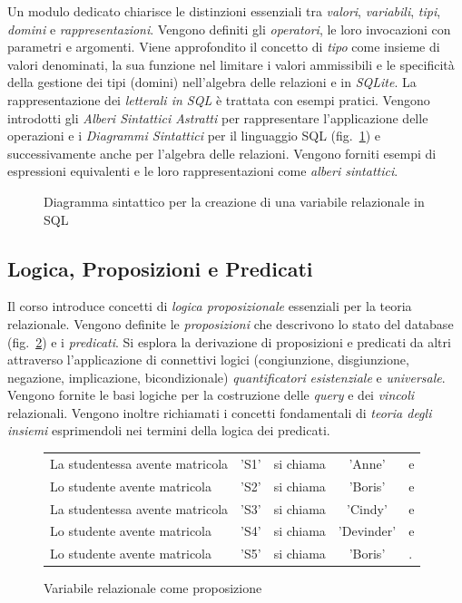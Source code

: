 \documentclass[withtimes]{easychair}
\theoremstyle{definition}
\begin{document}
Un modulo dedicato chiarisce le distinzioni essenziali tra \emph{valori}, \emph{variabili}, \emph{tipi}, \emph{domini} e \emph{rappresentazioni}. Vengono definiti gli \emph{operatori}, le loro invocazioni con parametri e argomenti. Viene approfondito il concetto di \emph{tipo} come insieme di valori denominati, la sua funzione nel limitare i valori ammissibili e le specificità della gestione dei tipi (domini) nell'algebra delle relazioni e in \emph{SQLite}. La rappresentazione dei \emph{letterali in SQL} è trattata con esempi pratici. Vengono introdotti gli \emph{Alberi Sintattici Astratti} per rappresentare l’applicazione delle operazioni e i \emph{Diagrammi Sintattici} per il linguaggio SQL (fig.~\ref{fig:sql-syntax}) e successivamente anche per l'algebra delle relazioni. Vengono forniti esempi di espressioni equivalenti e le loro rappresentazioni come \emph{alberi sintattici}.

\begin{figure}[hbt]
    \centering
    
    \caption{Diagramma sintattico per la creazione di una variabile relazionale in SQL}\label{fig:sql-syntax}
\end{figure}


\subsection{Logica, Proposizioni e Predicati}\label{logica-proposizioni-e-predicati}

Il corso introduce concetti di \emph{logica proposizionale} essenziali per la teoria relazionale. Vengono definite le \emph{proposizioni} che descrivono lo stato del database (fig.~\ref{fig:proposizioni}) e i \emph{predicati}. Si esplora la derivazione di proposizioni e predicati da altri attraverso l'applicazione di connettivi logici (congiunzione, disgiunzione, negazione, implicazione, bicondizionale)  \emph{quantificatori} \emph{esistenziale} e \emph{universale}. Vengono fornite le basi logiche per la costruzione delle \emph{query} e dei \emph{vincoli} relazionali. Vengono inoltre richiamati i concetti fondamentali di \emph{teoria degli insiemi} esprimendoli nei termini della logica dei predicati.

\begin{figure}[htb]
\centering
\begin{tabular}{lclcl}
La studentessa avente matricola & 'S1' & si chiama & 'Anne' & e \\
Lo studente avente matricola & 'S2' & si chiama & 	'Boris'& e \\
La studentessa avente matricola & 'S3' & si chiama & 'Cindy'& e \\
Lo studente avente matricola & 'S4' & si chiama & 'Devinder'& e \\
Lo studente avente matricola & 'S5' & si chiama & 'Boris'&.
\end{tabular}
\caption{Variabile relazionale come proposizione}\label{fig:proposizioni}
\end{figure}
\end{document}
